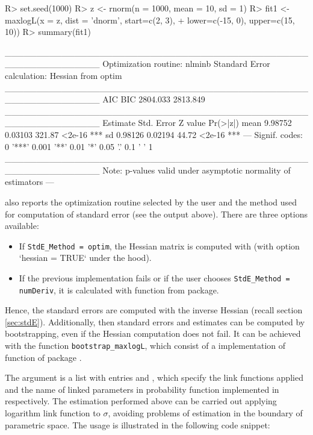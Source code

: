 \documentclass[nojss]{jss}
\begin{document}
\begin{Schunk}
\begin{Sinput}
R> set.seed(1000)
R> z <- rnorm(n = 1000, mean = 10, sd = 1)
R> fit1 <- maxlogL(x = z, dist = 'dnorm', start=c(2, 3),
+                  lower=c(-15, 0), upper=c(15, 10))
R> summary(fit1)
\end{Sinput}
\begin{Soutput}
_______________________________________________________________
Optimization routine: nlminb 
Standard Error calculation: Hessian from optim 
_______________________________________________________________
       AIC      BIC
  2804.033 2813.849
_______________________________________________________________
     Estimate  Std. Error Z value Pr(>|z|)    
mean   9.98752    0.03103  321.87   <2e-16 ***
sd     0.98126    0.02194   44.72   <2e-16 ***
---
Signif. codes:  0 '***' 0.001 '**' 0.01 '*' 0.05 '.' 0.1 ' ' 1
_______________________________________________________________
Note: p-values valid under asymptotic normality of estimators 
---
\end{Soutput}
\end{Schunk}

 also reports the optimization routine selected by the user and the method used for computation of standard error (see the  output above). There are three options available:

\begin{itemize}
  \item If \verb|StdE_Method = optim|, the Hessian matrix is computed with  (with option `hessian = TRUE` under the hood).
  \item If the previous implementation fails or if the user chooses \verb|StdE_Method = numDeriv|, it is calculated with  function from  package.
\end{itemize}

Hence, the standard errors are computed with the inverse Hessian (recall section \ref{sec:stdE}). Additionally, then standard errors and estimates can be computed by bootstrapping, even if the Hessian computation does not fail. It can be achieved with the function \verb|bootstrap_maxlogL|, which consist of a implementation of  function of  package \citep{Davison1997,Canty2017}.

The  argument is a list with entries  and , which specify the link functions applied and the name of linked parameters in probability function implemented in  respectively. The estimation performed above can be carried out applying logarithm link function to $\sigma$, avoiding problems of estimation in the boundary of parametric space. The usage is illustrated in the following code snippet:
\end{document}
